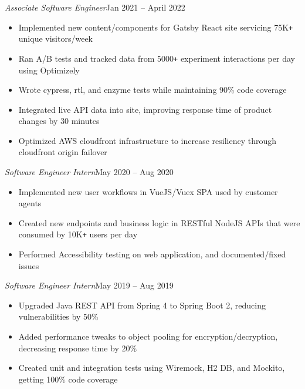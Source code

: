 \documentclass[letterpaper]{article}
\newcommand{\DatedEntry}[3]{
	\small\textit{#1}\hfill\small{#2}\\
	\vspace{0.1cm}#3\vspace{0.1cm}
}
\begin{document}
{
	\DatedEntry{Associate Software Engineer}
		{Jan 2021 -- April 2022}
		{
			\begin{itemize}[nolistsep]
				\item Implemented new content/components for Gatsby React site servicing 75K\texttt{+} unique visitors/week
				\item Ran A/B tests and tracked data from 5000\texttt{+} experiment interactions per day using Optimizely
				\item Wrote cypress, rtl, and enzyme tests while maintaining 90\% code coverage
				\item Integrated live API data into site, improving response time of product changes by 30 minutes
				\item Optimized AWS cloudfront infrastructure to increase resiliency through cloudfront origin failover
			\end{itemize}
	}
	\DatedEntry{Software Engineer Intern}
		{May 2020 -- Aug 2020}
		{
			\begin{itemize}[nolistsep]
				\item Implemented new user workflows in VueJS/Vuex SPA used by customer agents
				\item Created new endpoints and business logic in RESTful NodeJS APIs that were consumed by 10K\texttt{+} users per day
				\item Performed Accessibility testing on web application, and documented/fixed issues
			\end{itemize}
		}
	\DatedEntry{Software Engineer Intern}
		{May 2019 -- Aug 2019}
		{
			\begin{itemize}[nolistsep]
				\item Upgraded Java REST API from Spring 4 to Spring Boot 2, reducing vulnerabilities by 50\%
				\item Added performance tweaks to object pooling for encryption/decryption, decreasing response time by 20\%
				\item Created unit and integration tests using Wiremock, H2 DB, and Mockito, getting 100\% code coverage
			\end{itemize}
		}
}
\vspace{-0.3cm}
\end{document}
